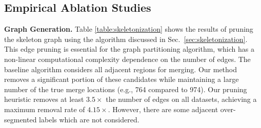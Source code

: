 \subsection{Empirical Ablation Studies}

\noindent\textbf{Graph Generation.}
Table \ref{table:skeletonization} shows the results of pruning the skeleton graph using the algorithm discussed in Sec.~\ref{sec:skeletonization}. 
This edge pruning is essential for the graph partitioning algorithm, which has a non-linear computational complexity dependence on the number of edges. 
The baseline algorithm considers all adjacent regions for merging. 
Our method removes a significant portion of these candidates while maintaining a large number of the true merge locations (e.g., 764 compared to 974). 
Our pruning heuristic removes at least $3.5\times$ the number of edges on all datasets, achieving a maximum removal rate of $4.15\times$.
However, there are some adjacent over-segmented labels which are not considered. 

\begin{table}
	\caption{The results of our graph pruning approach compared to the baseline graph with all adjacent regions. We show the number of true merge locations (e.g., 974) compared to total number of edges in the graph (e.g., 25,798) for each case. The number of missed splits corresponds to the number of split errors that our method misses compared to an adjacency matrix.}
	\centering
	\label{table:skeletonization}
\end{table}

